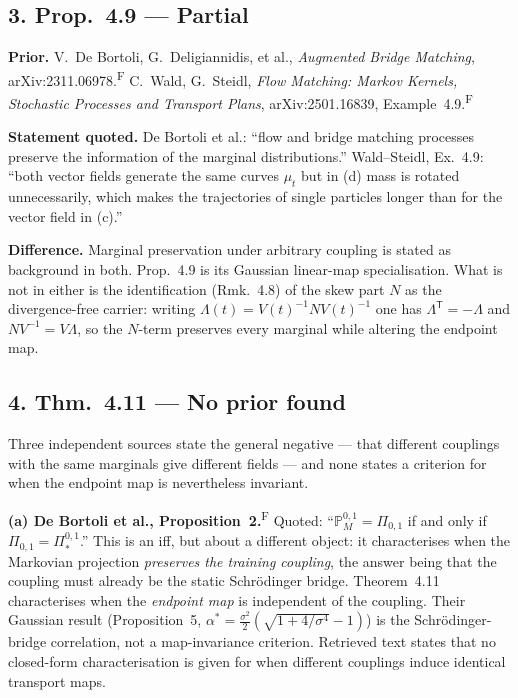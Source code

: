 \documentclass[11pt]{article}
\newcommand{\F}{\textsuperscript{F}}
\newcommand{\T}{\mathsf{T}}
\begin{document}
\subsection*{3. Prop.~4.9 --- Partial}

\textbf{Prior.} V.~De Bortoli, G.~Deligiannidis, et al., \emph{Augmented Bridge Matching},
arXiv:2311.06978.\F{} C.~Wald, G.~Steidl, \emph{Flow Matching: Markov Kernels, Stochastic
Processes and Transport Plans}, arXiv:2501.16839, Example~4.9.\F

\textbf{Statement quoted.} De Bortoli et al.: ``flow and bridge matching processes preserve the
information of the marginal distributions.'' Wald--Steidl, Ex.~4.9: ``both vector fields generate
the same curves $\mu_t$ but in (d) mass is rotated unnecessarily, which makes the trajectories of
single particles longer than for the vector field in (c).''

\textbf{Difference.} Marginal preservation under arbitrary coupling is stated as background in
both. Prop.~4.9 is its Gaussian linear-map specialisation. What is not in either is the
identification (Rmk.~4.8) of the skew part $N$ as the divergence-free carrier: writing
$\Lambda(t)=V(t)^{-1}NV(t)^{-1}$ one has $\Lambda^{\T}=-\Lambda$ and $NV^{-1}=V\Lambda$, so the
$N$-term preserves every marginal while altering the endpoint map.

\subsection*{4. Thm.~4.11 --- No prior found}

Three independent sources state the general negative --- that different couplings with the same
marginals give different fields --- and none states a criterion for when the endpoint map is
nevertheless invariant.

\textbf{(a) De Bortoli et al., Proposition~2.}\F{} Quoted:
``$\mathbb P^{0,1}_M=\Pi_{0,1}$ if and only if $\Pi_{0,1}=\Pi^{0,1}_*$.''
This is an iff, but about a different object: it characterises when the Markovian projection
\emph{preserves the training coupling}, the answer being that the coupling must already be the
static Schr\"odinger bridge. Theorem~4.11 characterises when the \emph{endpoint map} is
independent of the coupling. Their Gaussian result (Proposition~5,
$\alpha^*=\frac{\sigma^2}{2}(\sqrt{1+4/\sigma^4}-1)$) is the Schr\"odinger-bridge correlation, not
a map-invariance criterion. Retrieved text states that no closed-form characterisation is given
for when different couplings induce identical transport maps.
\end{document}
